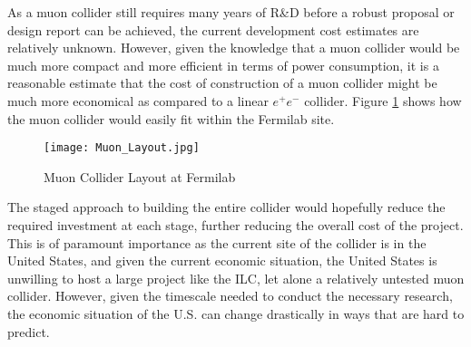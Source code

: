 As a muon collider still requires many years of R\&D before a robust proposal or design report can be achieved, the current development cost estimates are relatively unknown. However, given the knowledge that a muon collider would be much more compact and more efficient in terms of power consumption, it is a reasonable estimate that the cost of construction of a muon collider might be much more economical as compared to a linear $e^+ e^-$ collider. Figure \ref{Muon:Layout} shows how the muon collider would easily fit within the Fermilab site.

\begin{figure}[!htb]
\centering
\texttt{[image: Muon\_Layout.jpg]}
\caption{Muon Collider Layout at Fermilab}
\label{Muon:Layout}
\end{figure}
 
The staged approach to building the entire collider would hopefully reduce the required investment at each stage, further reducing the overall cost of the project. This is of paramount importance as the current site of the collider is in the United States, and given the current economic situation, the United States is unwilling to host a large project like the ILC, let alone a relatively untested muon collider. However, given the timescale needed to conduct the necessary research, the economic situation of the U.S. can change drastically in ways that are hard to predict.
